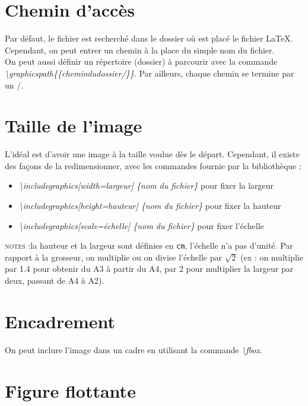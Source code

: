 \documentclass[a4paper, 10pt]{book}
\begin{document}
\section{Chemin d'accès}

Par défaut, le fichier est recherché dans le dossier où est placé le fichier \LaTeX. Cependant, on peut entrer un chemin à la place du simple nom du fichier.\\
On peut aussi définir un répertoire (dossier) à parcourir avec la commande \textit{\textbackslash graphicspath\{\{chemindudossier/\}\}}. Par ailleurs, chaque chemin se termine par un /. 

\section{Taille de l'image}

L'idéal est d'avoir une image à la taille voulue dès le départ. Cependant, il existe des façons de la redimensionner, avec les commandes fournie par la bibliothèque : \\

\begin{itemize}
\item \textit{\textbackslash includegraphics[width=largeur] \{nom du fichier\} }pour fixer la largeur
\item \textit{\textbackslash includegraphics[height=hauteur] \{nom du fichier\} }pour fixer la hauteur
\item \textit{\textbackslash includegraphics[scale=échelle] \{nom du fichier\} }pour fixer l'échelle\\
\end{itemize}

\textsc{notes :}la hauteur et la largeur sont définies en \texttt{cm}, l'échelle n'a pas d'unité. Par rapport à la grosseur, on multiplie ou on divise l'échelle par $\sqrt{2}$ (ex : on multiplie par 1.4 pour obtenir du A3 à partir du A4, par 2 pour multiplier la largeur par deux, passant de A4 à A2).

\section{Encadrement}

On peut inclure l'image dans un cadre en utilisant la commande \textit{\textbackslash fbox}.

\section{Figure flottante}
\end{document}
